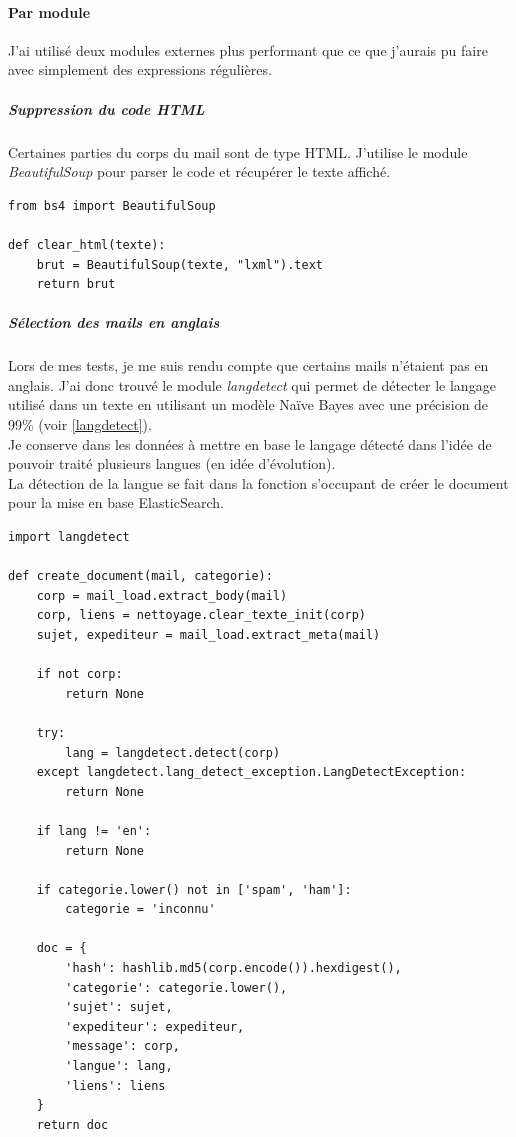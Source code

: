 \documentclass[a4paper,12pt]{article}
\begin{document}
 
			\paragraph{Par module}
				J'ai utilisé deux modules externes plus performant que ce que j'aurais pu faire avec simplement des expressions régulières. 
				
				\subparagraph{Suppression du code HTML} Certaines parties du corps du mail sont de type HTML. J'utilise le module \emph{BeautifulSoup} pour parser le code et récupérer le texte affiché. 
		
					\begin{lstlisting}[title=Nettoyage des nombres]		
from bs4 import BeautifulSoup

def clear_html(texte):
    brut = BeautifulSoup(texte, "lxml").text
    return brut \end{lstlisting}	
    		
				\subparagraph{Sélection des mails en anglais} Lors de mes tests, je me suis rendu compte que certains mails n'étaient pas en anglais. J'ai donc trouvé le module \emph{langdetect} qui permet de détecter le langage utilisé dans un texte en utilisant un modèle Naïve Bayes avec une précision de 99\% (voir \ref{langdetect}). \\
				Je conserve dans les données à mettre en base le langage détecté dans l'idée de pouvoir traité plusieurs langues (en idée d'évolution).\\
				
				La détection de la langue se fait dans la fonction s'occupant de créer le document pour la mise en base ElasticSearch.
				
				\begin{lstlisting}[title=Création d'un document]	
import langdetect

def create_document(mail, categorie):
    corp = mail_load.extract_body(mail)
    corp, liens = nettoyage.clear_texte_init(corp)
    sujet, expediteur = mail_load.extract_meta(mail)

    if not corp:
        return None

    try:
        lang = langdetect.detect(corp)
    except langdetect.lang_detect_exception.LangDetectException:
        return None

    if lang != 'en':
        return None

    if categorie.lower() not in ['spam', 'ham']:
        categorie = 'inconnu'

    doc = {
        'hash': hashlib.md5(corp.encode()).hexdigest(),
        'categorie': categorie.lower(),
        'sujet': sujet,
        'expediteur': expediteur,
        'message': corp,
        'langue': lang,
        'liens': liens
    }
    return doc \end{lstlisting}
 
\end{document}
